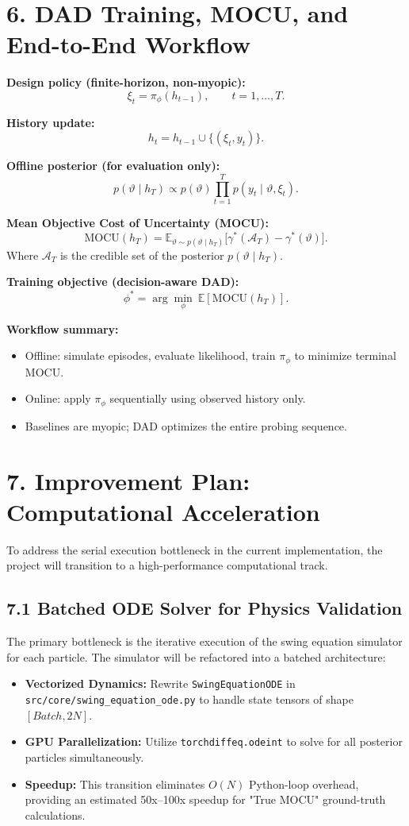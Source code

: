 \documentclass[12pt]{article}
\begin{document}
\newpage
\section*{6. DAD Training, MOCU, and End-to-End Workflow}

\textbf{Design policy (finite-horizon, non-myopic):}
\[
\xi_t=\pi_\phi(h_{t-1}), \qquad t=1,\dots,T.
\]

\textbf{History update:}
\[
h_t=h_{t-1}\cup\{(\xi_t,y_t)\}.
\]

\textbf{Offline posterior (for evaluation only):}
\[
p(\vartheta\mid h_T)\propto
p(\vartheta)\prod_{t=1}^T p(y_t\mid \vartheta,\xi_t).
\]

\textbf{Mean Objective Cost of Uncertainty (MOCU):}
\[
\mathrm{MOCU}(h_T)=
\mathbb{E}_{\vartheta\sim p(\vartheta\mid h_T)}
\big[\gamma^*(\mathcal{A}_T)-\gamma^*(\vartheta)\big].
\]
Where $\mathcal{A}_T$ is the credible set of the posterior $p(\vartheta \mid h_T)$.

\textbf{Training objective (decision-aware DAD):}
\[
\phi^*=\arg\min_\phi\ \mathbb{E}[\mathrm{MOCU}(h_T)].
\]

\textbf{Workflow summary:}
\begin{itemize}
\item Offline: simulate episodes, evaluate likelihood, train $\pi_\phi$ to minimize terminal MOCU.
\item Online: apply $\pi_\phi$ sequentially using observed history only.
\item Baselines are myopic; DAD optimizes the entire probing sequence.
\end{itemize}

\newpage
\section*{7. Improvement Plan: Computational Acceleration}

To address the serial execution bottleneck in the current implementation, the project will transition to a high-performance computational track.

\subsection*{7.1 Batched ODE Solver for Physics Validation}
The primary bottleneck is the iterative execution of the swing equation simulator for each particle. The simulator will be refactored into a batched architecture:
\begin{itemize}
    \item \textbf{Vectorized Dynamics:} Rewrite \texttt{SwingEquationODE} in \texttt{src/core/swing\_equation\_ode.py} to handle state tensors of shape $[Batch, 2N]$.
    \item \textbf{GPU Parallelization:} Utilize \texttt{torchdiffeq.odeint} to solve for all posterior particles simultaneously.
    \item \textbf{Speedup:} This transition eliminates $O(N)$ Python-loop overhead, providing an estimated 50x--100x speedup for "True MOCU" ground-truth calculations.
\end{itemize}
\end{document}
